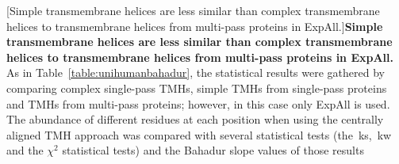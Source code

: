 \begin{table}[htbp]

  \centering
  [Simple transmembrane helices are less similar than complex transmembrane helices to transmembrane helices from multi-pass proteins in ExpAll.]{\textbf{Simple transmembrane helices are less similar than complex transmembrane helices to transmembrane helices from multi-pass proteins in ExpAll.}
  As in Table~\ref{table:unihumanbahadur}, the statistical results were gathered by comparing complex single-pass TMHs, simple TMHs from single-pass proteins and TMHs from multi-pass proteins; however, in this case only ExpAll is used.
  The abundance of different residues at each position when using the centrally aligned TMH approach was compared with several statistical tests (the~\gls{ks},~\gls{kw} and the $\chi^2$ statistical tests) and the Bahadur slope values of those results}
\end{table}
